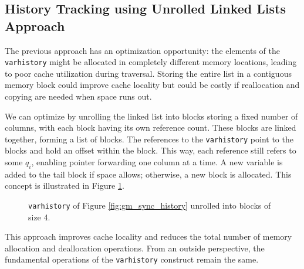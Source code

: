 \subsection{History Tracking using Unrolled Linked Lists Approach}\label{subsec:gm_sync_history_unrolled}
The previous approach has an optimization opportunity: the elements of the \texttt{varhistory} might be allocated in completely different memory locations, leading to poor cache utilization during traversal. Storing the entire list in a contiguous memory block could improve cache locality but could be costly if reallocation and copying are needed when space runs out.

We can optimize by unrolling the linked list into blocks storing a fixed number of columns, with each block having its own reference count. These blocks are linked together, forming a list of blocks. The references to the \texttt{varhistory} point to the blocks and hold an offset within the block. This way, each reference still refers to some $q_i$, enabling pointer forwarding one column at a time. A new variable is added to the tail block if space allows; otherwise, a new block is allocated. This concept is illustrated in Figure \ref{fig:gm_sync_history_unrolled}.

\begin{figure}[H]
\centering
{}
\caption{\texttt{varhistory} of Figure \ref{fig:gm_sync_history} unrolled into blocks of size 4.}
\label{fig:gm_sync_history_unrolled}
\end{figure}

This approach improves cache locality and reduces the total number of memory allocation and deallocation operations. From an outside perspective, the fundamental operations of the \texttt{varhistory} construct remain the same.
